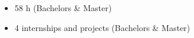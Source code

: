 
\begin{itemize}
	\item 58 h (Bachelors \& Master)
\end{itemize}

\begin{itemize}
	\item 4 internships and projects (Bachelors \& Master)
\end{itemize}










%
%
%




